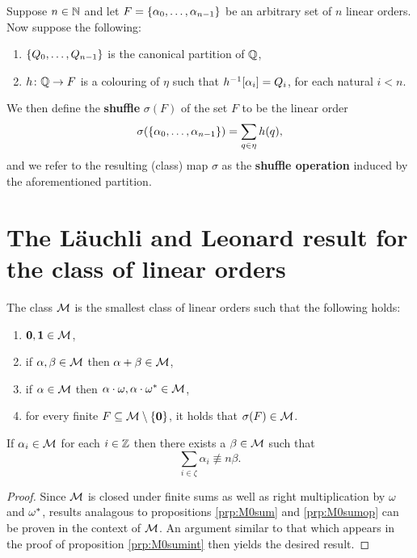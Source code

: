 \begin{dfn}
	Suppose $n\in\mathbb{N}$ and let $F=\left\lbrace \alpha_0,\dotsc,\alpha_{n-1}\right\rbrace$ be an arbitrary set of $n$ linear orders.  Now suppose the following:
	\begin{enumerate}
		\item $\left\lbrace Q_0,\dotsc,Q_{n-1}\right\rbrace$ is the canonical partition of $\mathbb{Q}$,
		\item $h\colon\mathbb{Q}\to F$ is a colouring of $\eta$ such that ${h}^{-1}[\alpha_i]=Q_i$, for each natural $i<n$.
	\end{enumerate}
	We then define the \textbf{shuffle} $\sigma(F)$ of the set $F$ to be the linear order
	\begin{equation}
		\sigma(\left\lbrace \alpha_0,\dotsc,\alpha_{n-1}\right\rbrace)=\sum_{q\in\eta}h(q),
	\end{equation}
	and we refer to the resulting (class) map $\sigma$ as the \textbf{shuffle operation} induced by the aforementioned partition.
\end{dfn}


\section{The L\"auchli and Leonard result for the class of linear orders}

\begin{dfn}
	The class $\mathcal{M}$ is the smallest class of linear orders such that the following holds:
	\begin{enumerate}
		\item	$\mathbf{0},\mathbf{1}\in\mathcal{M}$,
		\item	if $\alpha,\beta\in\mathcal{M}$ then $\alpha+\beta\in\mathcal{M}$,
		\item	if $\alpha\in\mathcal{M}$ then $\alpha\cdot\omega,\alpha\cdot{\omega}^\ast\in\mathcal{M}$,
		\item	for every finite $F\subseteq\mathcal{M}\setminus\left\lbrace \mathbf{0}\right\rbrace$, it holds that $\sigma(F)\in\mathcal{M}$.
	\end{enumerate}
\end{dfn}

\begin{prp}\label{prp:Msumint}
	If $\alpha_i\in\mathcal{M}$ for each $i\in\mathbb{Z}$ then there exists a $\beta\in\mathcal{M}$ such that
	\begin{equation}
		\sum_{i\in\zeta}\alpha_i\nequiv{n}\beta.
	\end{equation}
\end{prp}
\begin{proof}
	Since $\mathcal{M}$ is closed under finite sums as well as right multiplication by $\omega$ and ${\omega}^\ast$, results analagous to propositions \ref{prp:M0sum} and \ref{prp:M0sumop} can be proven in the context of $\mathcal{M}$.  An argument similar to that which appears in the proof of proposition \ref{prp:M0sumint} then yields the desired result.
\end{proof}

